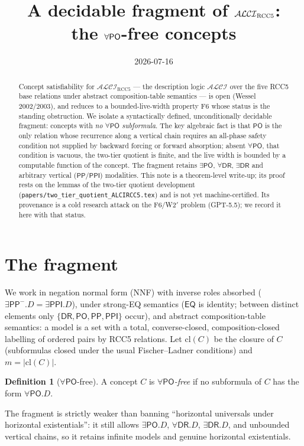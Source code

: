 \documentclass[11pt]{article}
\title{A decidable fragment of $\ALCIRCC$:\\ the $\forall\PO$-free
concepts}
\author{}
\date{2026-07-16}
\newcommand{\ALCIRCC}{\mathcal{ALCI}_{\mathrm{RCC5}}}
\newcommand{\DR}{\mathsf{DR}}
\newcommand{\PO}{\mathsf{PO}}
\newcommand{\PP}{\mathsf{PP}}
\newcommand{\PPI}{\mathsf{PPI}}
\newcommand{\EQ}{\mathsf{EQ}}
\newcommand{\cl}{\mathrm{cl}}
\newcommand{\code}[1]{\texttt{#1}}
\theoremstyle{plain}
\theoremstyle{definition}
\newtheorem{definition}[theorem]{Definition}
\begin{document}
\maketitle

\begin{abstract}
Concept satisfiability for $\ALCIRCC$ --- the description logic
$\mathcal{ALCI}$ over the five RCC5 base relations under abstract
composition-table semantics --- is open (Wessel 2002/2003), and reduces
to a bounded-live-width property F6 whose status is the standing
obstruction. We isolate a syntactically defined, unconditionally
decidable fragment: concepts with \emph{no $\forall\PO$ subformula}. The
key algebraic fact is that $\PO$ is the only relation whose recurrence
along a vertical chain requires an all-phase safety condition not
supplied by backward forcing or forward absorption; absent
$\forall\PO$, that condition is vacuous, the two-tier quotient is
finite, and the live width is bounded by a computable function of the
concept. The fragment retains $\exists\PO$, $\forall\DR$, $\exists\DR$
and arbitrary vertical ($\PP/\PPI$) modalities. This note is a
theorem-level write-up; its proof rests on the lemmas of the two-tier
quotient development (\code{papers/two\_tier\_quotient\_ALCIRCC5.tex})
and is not yet machine-certified. Its provenance is a cold research
attack on the F6/W2$'$ problem (GPT-5.5); we record it here with that
status.
\end{abstract}

\section{The fragment}

We work in negation normal form (NNF) with inverse roles absorbed
($\exists\PP^-.D = \exists\PPI.D$), under strong-EQ semantics ($\EQ$ is
identity; between distinct elements only $\{\DR,\PO,\PP,\PPI\}$ occur),
and abstract composition-table semantics: a model is a set with a
total, converse-closed, composition-closed labelling of ordered pairs by
RCC5 relations. Let $\cl(C)$ be the closure of $C$ (subformulas closed
under the usual Fischer--Ladner conditions) and $m=|\cl(C)|$.

\begin{definition}[$\forall\PO$-free]
A concept $C$ is \emph{$\forall\PO$-free} if no subformula of $C$ has the
form $\forall\PO.D$.
\end{definition}

The fragment is strictly weaker than banning ``horizontal universals
under horizontal existentials'': it still allows $\exists\PO.D$,
$\forall\DR.D$, $\exists\DR.D$, and unbounded vertical chains, so it
retains infinite models and genuine horizontal existentials.
\end{document}
